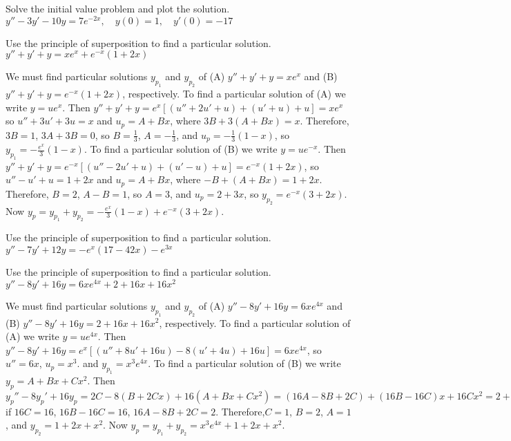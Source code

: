 \documentclass{ximera}
\begin{document}
\begin{problem}\label{exer:5.4.23} Solve the
initial value problem and plot the solution. $y''-3y'-10y=7e^{-2x}, \quad  y(0)=1,\quad y'(0)=-17$
\end{problem}

\begin{problem}\label{exer:5.4.24} Use
the principle of superposition to find a particular solution. $y''+y'+y=xe^x+e^{-x}(1+2x)$
\begin{solution}
We must find particular solutions $y_{p_1}$ and $y_{p_2}$ of (A)
$y''+y'+y=xe^x$ and (B) $y''+y'+y=e^{-x}(1+2x)$, respectively. To find
a particular solution of (A) we write $y=ue^x$. Then
$y''+y'+y=e^x\left[(u''+2u'+u)+(u'+u)+u\right]= xe^x$ so $u''+3u'+3u
=x$ and $u_p=A+Bx$, where $3B+3(A+Bx)=x$. Therefore,$3B=1$, $3A+3B=0$,
so $B=\frac{1}{3}$, $A=-\frac{1}{3}$, and $u_p=-\frac{1}{3}(1-x)
$, so $y_{p_1}=-\frac{e^x}{3}(1-x)$. To find a particular solution
of (B) we write $y=ue^{-x}$. Then
$y''+y'+y=e^{-x}\left[(u''-2u'+u)+(u'-u)+u\right]= e^{-x}(1+2x)$, so
$u''-u'+u =1+2x$ and $u_p=A+Bx$, where $-B+(A+Bx)=1+2x$. Therefore,
$B=2$, $A-B=1$, so $A=3$, and $u_p=2+3x$, so $y_{p_2}=e^{-x}(3+2x)$.
Now $y_p=y_{p_1}+y_{p_2}=-\frac{e^x}{3}(1-x)+e^{-x}(3+2x)$.
\end{solution}
\end{problem}

\begin{problem}\label{exer:5.4.25} Use
the principle of superposition to find a particular solution. $y''-7y'+12y=-e^x(17-42x)-e^{3x}$
\end{problem}

\begin{problem}\label{exer:5.4.26} Use
the principle of superposition to find a particular solution. $y''-8y'+16y=6xe^{4x}+2+16x+16x^2$
\begin{solution}
We must find particular solutions $y_{p_1}$ and $y_{p_2}$ of (A)
$y''-8y'+16y=6xe^{4x}$ and (B) $y''-8y'+16y=2+16x+16x^2$,
respectively. To find a particular solution of (A) we write
$y=ue^{4x}$. Then
$y''-8y'+16y=e^x\left[(u''+8u'+16u)-8(u'+4u)+16u\right]= 6xe^{4x}$, so
$u'' =6x$, $u_p=x^3$. and $y_{p_1}=x^3e^{4x}$. To find a particular
solution of (B) we write $y_p=A+Bx+Cx^2$. Then
$y_p''-8y_p'+16y_p=2C-8(B+2Cx)+16(A+Bx+Cx^2)=(16A-8B+2C)
+(16B-16C)x+16Cx^2=2+16x+16x^2$ if $16C=16$, $16B-16C=16$,
$16A-8B+2C=2$. Therefore,$C=1$, $B=2$, $A=1$, and $y_{p_2}=1+2x+x^2$.
Now $y_p=y_{p_1}+y_{p_2}=x^3e^{4x}+1+2x+x^2$.
\end{solution}
\end{problem}
\end{document}
